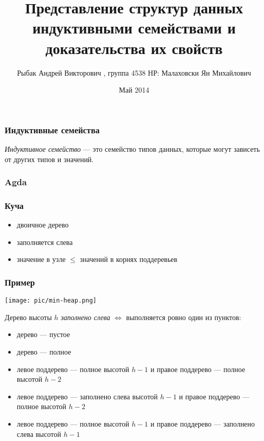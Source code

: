 \documentclass{beamer}
\title[Представление структур данных индуктивными семействами и доказательства их свойств]{Представление структур данных индуктивными семействами и доказательства их свойств}
\institute{НИУ ИТМО}
\author[Рыбак А.В.]{Рыбак Андрей Викторович , группа 4538
\newline НР: Малаховски Ян Михайлович}
\date{
Май 2014
}
\begin{document}
\maketitle

\begin{frame}
    \frametitle{Индуктивные семейства}
        \emph{Индуктивное семейство} — это семейство типов данных,
        которые могут зависеть от других типов и значений.
\end{frame}

\begin{frame}
    \frametitle{Agda}
    
\end{frame}

\begin{frame}
    \frametitle{Куча}
    \begin{itemize}
        \item двоичное дерево
        \item заполняется слева
        \item значение в узле $ \leq $ значений в корнях поддеревьев
    \end{itemize}
\end{frame}
\begin{frame}
    \frametitle{Пример}
    \texttt{[image: pic/min-heap.png]}
\end{frame}
\begin{frame}
Дерево высоты $h$ \emph{заполнено слева} $ \iff $
выполняется ровно один из пунктов:
  \begin{itemize}
    \item дерево — пустое
    \item дерево — полное
    \item левое поддерево — полное высотой $h-1$ и правое поддерево — полное высотой $h-2$
    \item левое поддерево — заполнено слева высотой $h-1$ и правое поддерево — полное высотой $h-2$
    \item левое поддерево — полное высотой $h-1$ и правое поддерево — заполнено слева высотой $h-1$
  \end{itemize}

\end{frame}
\begin{frame}
    
\end{frame}
\end{document}
